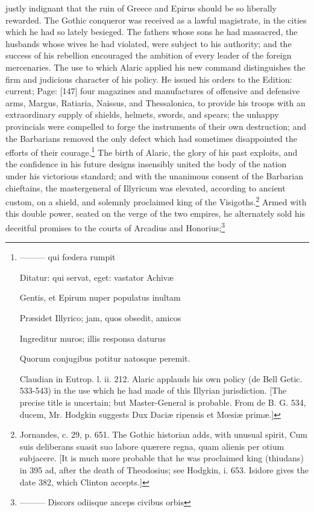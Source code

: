 justly indignant that the ruin of Greece and Epirus should be so liberally rewarded. The Gothic conqueror was received as a lawful magistrate, in the cities which he had so lately besieged. The fathers whose sons he had massacred, the husbands whose wives he had violated, were subject to his authority; and the success of his rebellion encouraged the ambition of every leader of the foreign mercenaries. The use to which Alaric applied his new command distinguishes the firm and judicious character of his policy. He issued his orders to the Edition: current; Page: [147] four magazines and manufactures of offensive and defensive arms, Margus, Ratiaria, Naissus, and Thessalonica, to provide his troops with an extraordinary supply of shields, helmets, swords, and spears; the unhappy provincials were compelled to forge the instruments of their own destruction; and the Barbarians removed the only defect which had sometimes disappointed the efforts of their courage.\footnote{\texthebrew{———} qui fœdera rumpit

Ditatur: qui servat, eget: vastator Achivæ

Gentis, et Epirum nuper populatus inultam

Præsidet Illyrico; jam, quos obsedit, amicos

Ingreditur muros; illis responsa daturus

Quorum conjugibus potitur natosque peremit.

Claudian in Eutrop. l. ii. 212. Alaric applauds his own policy (de Bell Getic. 533-543) in the use which he had made of this Illyrian jurisdiction. [The precise title is uncertain; but Master-General is probable. From de B. G. 534, ducem, Mr. Hodgkin suggests Dux Daciæ ripensis et Mœsiæ primæ.]} The birth of Alaric, the glory of his past exploits, and the confidence in his future designs insensibly united the body of the nation under his victorious standard; and with the unanimous consent of the Barbarian chieftains, the mastergeneral of Illyricum was elevated, according to ancient custom, on a shield, and solemnly proclaimed king of the Visigoths.\footnote{Jornandes, c. 29, p. 651. The Gothic historian adds, with unusual spirit, Cum suis deliberans suasit suo labore quærere regna, quam alienis per otium subjacere. [It is much more probable that he was proclaimed king (thiudans) in 395 ad, after the death of Theodosius; see Hodgkin, i. 653. Isidore gives the date 382, which Clinton accepts.]} Armed with this double power, seated on the verge of the two empires, he alternately sold his deceitful promises to the courts of Arcadius and Honorius;\footnote{\texthebrew{———} Discors odiisque anceps civibus orbis

}
